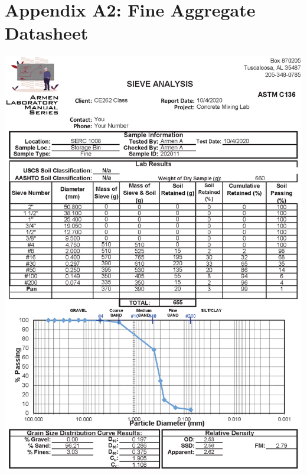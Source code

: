 \documentclass[12pt]{article}
\begin{document}
\section*{Appendix A2: Fine Aggregate Datasheet}
\label{AppendixB}
\begin{center}
    \includegraphics[width=1\linewidth]{Fine.eps}
\end{center}

\pagebreak
\end{document}
